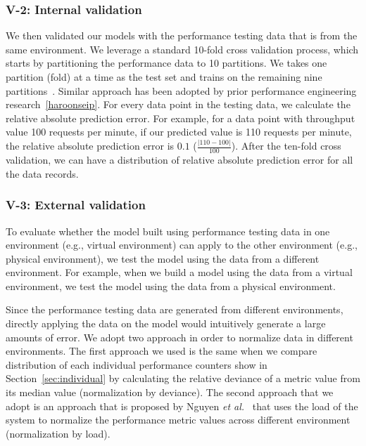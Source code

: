 \subsubsection{V-2: Internal validation}

We then validated our models with the performance testing data that is from the same environment. We leverage a standard 10-fold cross validation process, which starts by partitioning the performance data to 10 partitions. We takes one partition (fold) at a time as the test set and trains on the remaining nine partitions~\cite{10foldcross,kohavi1995study}. Similar approach has been adopted by prior performance engineering research~\ref{haroonseip}. For every data point in the testing data, we calculate the relative absolute prediction error. For example, for a data point with throughput value 100 requests per minute, if our predicted value is 110 requests per minute, the relative absolute prediction error is $0.1$ ($\frac{|110-100|}{100}$). After the ten-fold cross validation, we can have a distribution of relative absolute prediction error for all the data records.



\subsubsection{V-3: External validation}
To evaluate whether the model built using performance testing data in one environment (e.g., virtual environment) can apply to the other environment (e.g., physical environment), we test the model using the data from a different environment. For example, when we build a model using the data from a virtual environment, we test the model using the data from a physical environment. 

Since the performance testing data are generated from different environments, directly applying the data on the model would intuitively generate a large amounts of error. We adopt two approach in order to normalize data in different environments. The first approach we used is the same when we compare distribution of each individual performance counters show in Section~\ref{sec:individual} by calculating the relative deviance of a metric value from its median value (normalization by deviance). The second approach that we adopt is an approach that is proposed by Nguyen \textit{et al.}~\cite{Nguyen:2012:ADP:2188286.2188344} that uses the load of the system to normalize the performance metric values across different environment (normalization by load). 

